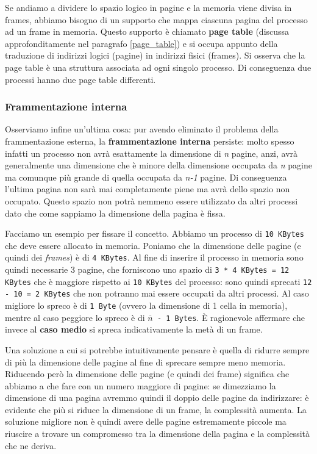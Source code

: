 Se andiamo a dividere lo spazio logico in pagine e la memoria viene divisa in frames, abbiamo bisogno di un supporto che mappa ciascuna pagina del processo ad un frame in memoria. Questo supporto è chiamato \textbf{page table} (discussa approfonditamente nel paragrafo \ref{page_table}) e si occupa appunto della traduzione di indirizzi logici (pagine) in indirizzi fisici (frames). Si osserva che la page table è una struttura associata ad ogni singolo processo. Di conseguenza due processi hanno due page table differenti.

% 
\subsubsection{Frammentazione interna}
Osserviamo infine un'ultima cosa: pur avendo eliminato il problema della frammentazione esterna, la \textbf{frammentazione interna} persiste: molto spesso infatti un processo non avrà esattamente la dimensione di \textit{n} pagine, anzi, avrà generalmente una dimensione che è minore della dimensione occupata da \textit{n} pagine ma comunque più grande di quella occupata da \textit{n-1} pagine. Di conseguenza l'ultima pagina non sarà mai completamente piene ma avrà dello spazio non occupato. Questo spazio non potrà nemmeno essere utilizzato da altri processi dato che come sappiamo la dimensione della pagina è fissa.

Facciamo un esempio per fissare il concetto. Abbiamo un processo di \texttt{10 KBytes} che deve essere allocato in memoria. Poniamo che la dimensione delle pagine (e quindi dei \textit{frames}) è di \texttt{4 KBytes}. Al fine di inserire il processo in memoria sono quindi necessarie 3 pagine, che forniscono uno spazio di \texttt{3 * 4 KBytes = 12 KBytes} che è maggiore rispetto ai \texttt{10 KBytes} del processo: sono quindi sprecati \texttt{12 - 10 = 2 KBytes} che non potranno mai essere occupati da altri processi. Al caso migliore lo spreco è di \texttt{1 Byte} (ovvero la dimensione di 1 cella in memoria), mentre al caso peggiore lo spreco è di \texttt{$\overline{n}$ - 1 Bytes}. È ragionevole affermare che invece al \textbf{caso medio} si spreca indicativamente la metà di un frame.

Una soluzione a cui si potrebbe intuitivamente pensare è quella di ridurre sempre di più la dimensione delle pagine al fine di sprecare sempre meno memoria. Riducendo però la dimensione delle pagine (e quindi dei frame) significa che abbiamo a che fare con un numero maggiore di pagine: se dimezziamo la dimensione di una pagina avremmo quindi il doppio delle pagine da indirizzare: è evidente che più si riduce la dimensione di un frame, la complessità aumenta. La soluzione migliore non è quindi avere delle pagine estremamente piccole ma riuscire a trovare un compromesso tra la dimensione della pagina e la complessità che ne deriva.

